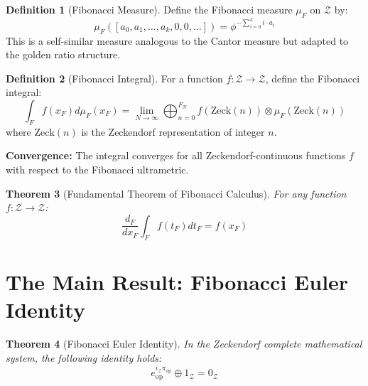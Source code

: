 \documentclass[12pt]{article}
\theoremstyle{plain}
\newtheorem{theorem}{Theorem}[section]
\theoremstyle{definition}
\newtheorem{definition}[theorem]{Definition}
\begin{document}
\begin{definition}[Fibonacci Measure]
Define the Fibonacci measure $\mu_F$ on $\mathcal{Z}$ by:
$$\mu_F([a_0, a_1, \ldots, a_k, 0, 0, \ldots]) = \phi^{-\sum_{i=0}^k i \cdot a_i}$$
This is a self-similar measure analogous to the Cantor measure but adapted to the golden ratio structure.
\end{definition}

\begin{definition}[Fibonacci Integral]
For a function $f: \mathcal{Z} \to \mathcal{Z}$, define the Fibonacci integral:
$$\int_F f(x_F) d\mu_F(x_F) = \lim_{N \to \infty} \bigoplus_{n=0}^{F_N} f\left(\text{Zeck}(n)\right) \otimes \mu_F(\text{Zeck}(n))$$
where $\text{Zeck}(n)$ is the Zeckendorf representation of integer $n$.

\textbf{Convergence:} The integral converges for all Zeckendorf-continuous functions $f$ with respect to the Fibonacci ultrametric.
\end{definition}

\begin{theorem}[Fundamental Theorem of Fibonacci Calculus]
For any function $f: \mathcal{Z} \to \mathcal{Z}$:
$$\frac{d_F}{dx_F} \int_F f(t_F) dt_F = f(x_F)$$
\end{theorem}

\section{The Main Result: Fibonacci Euler Identity}

\begin{theorem}[Fibonacci Euler Identity]
\label{thm:main}
In the Zeckendorf complete mathematical system, the following identity holds:
$$e_{\text{op}}^{i_{\mathcal{Z}}\pi_{\text{op}}} \oplus 1_{\mathcal{Z}} = 0_{\mathcal{Z}}$$
\end{theorem}
\end{document}
